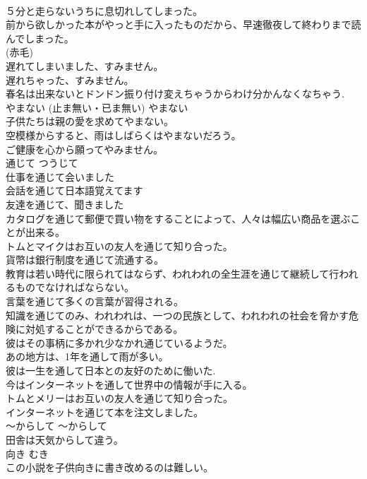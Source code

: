 \documentclass[8pt]{extreport}
\begin{document}
\begin{CJK}{UTF8}{min}
\\	５分と走らないうちに息切れしてしまった。  
\\	前から欲しかった本がやっと手に入ったものだから、早速徹夜して終わりまで読んでしまった。  
\\	(赤毛)
\\	遅れてしまいました、すみません。   
\\	遅れちゃった、すみません。  
\\	春名は出来ないとドンドン振り付け変えちゃうからわけ分かんなくなちゃう.   
\\	やまない (止ま無い・已ま無い)	やまない	
\\	子供たちは親の愛を求めてやまない。  
\\	空模様からすると、雨はしばらくはやまないだろう。   
\\	ご健康を心から願ってやみません。  
\\	通じて	つうじて	
\\	仕事を通じて会いました  
\\	会話を通じて日本語覚えてます  
\\	友達を通じて、聞きました  
\\	カタログを通じて郵便で買い物をすることによって、人々は幅広い商品を選ぶことが出来る。   
\\	トムとマイクはお互いの友人を通じて知り合った。   
\\	貨幣は銀行制度を通じて流通する。   
\\	教育は若い時代に限られてはならず、われわれの全生涯を通じて継続して行われるものでなければならない。   
\\	言葉を通じて多くの言葉が習得される。   
\\	知識を通じてのみ、われわれは、一つの民族として、われわれの社会を脅かす危険に対処することができるからである。   
\\	彼はその事柄に多かれ少なかれ通じているようだ。  
\\	あの地方は、1年を通して雨が多い。  
\\	彼は一生を通して日本との友好のために働いた.  
\\	今はインターネットを通して世界中の情報が手に入る。  
\\	トムとメリーはお互いの友人を通じて知り合った。   
\\	インターネットを通じて本を注文しました。   
\\	〜からして	〜からして	
\\	田舎は天気からして違う。  
\\	向き	むき	
\\	この小説を子供向きに書き改めるのは難しい。  

\end{CJK}
\end{document}
